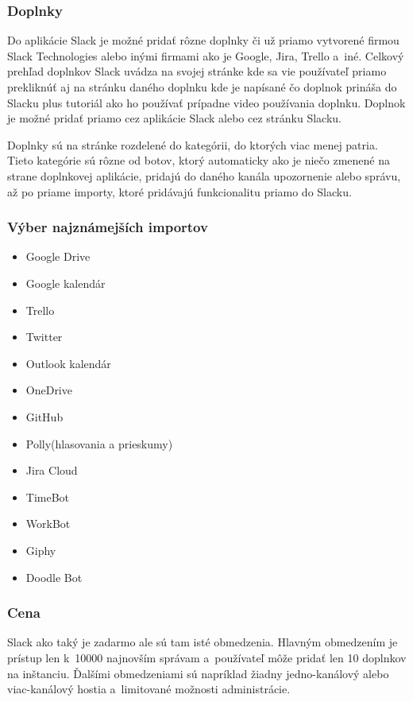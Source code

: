 \subsubsection{Doplnky}
\indent Do aplikácie Slack je možné pridať rôzne doplnky či už priamo vytvorené firmou Slack Technologies alebo inými firmami ako je Google, Jira, Trello a iné. Celkový prehľad doplnkov Slack uvádza na svojej stránke kde sa vie používateľ priamo prekliknúť aj na stránku daného doplnku kde je napísané čo doplnok prináša do Slacku plus tutoriál ako ho používať prípadne video používania doplnku. Doplnok je možné pridať priamo cez aplikácie Slack alebo cez stránku Slacku.

\indent Doplnky sú na stránke rozdelené do kategórii, do ktorých viac menej patria. Tieto kategórie sú rôzne od botov, ktorý automaticky ako je niečo zmenené na strane doplnkovej aplikácie, pridajú do daného kanála upozornenie alebo správu, až po priame importy, ktoré pridávajú funkcionalitu priamo do Slacku.
\subsubsection{Výber najznámejších importov}
\begin{itemize}
    \item Google Drive
    \item Google kalendár
    \item Trello
    \item Twitter
    \item Outlook kalendár
    \item OneDrive
    \item GitHub
    \item Polly(hlasovania a prieskumy)
    \item Jira Cloud
    \item TimeBot
    \item WorkBot
    \item Giphy
    \item Doodle Bot
\end{itemize}
\subsubsection{Cena}
\indent Slack ako taký je zadarmo ale sú tam isté obmedzenia. Hlavným obmedzením je prístup len k 10000 najnovším správam a používateľ môže pridať len 10 doplnkov na inštanciu. Ďalšími obmedzeniami sú napríklad žiadny jedno-kanálový alebo viac-kanálový hostia a limitované možnosti administrácie. 

